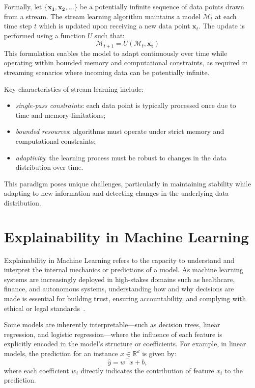Formally, let $\{\mathbf{x_1, x_2,\ldots} \} $ be a potentially infinite
sequence of data points drawn from a stream. The stream learning algorithm
maintains a model $\mathcal{M}_t$ at each time step $t$ which is updated upon
receiving a new data point $\mathbf{x}_t$. The update is performed using a
function $U$ such that:
\begin{equation}
    \mathcal{M}_{t+1} = U(\mathcal{M}_t, \mathbf{x_t})
\end{equation}
This formulation enables the model to adapt continuously over time while
operating within bounded memory and computational constraints, as required
in streaming scenarios where incoming data can be potentially infinite.

Key characteristics of stream learning include:
\begin{itemize}
    \item \emph{single-pass constraints}: each data point is typically processed once due to
          time and memory limitations;
    \item \emph{bounded resources}: algorithms must operate under strict memory and
          computational constraints;
    \item \emph{adaptivity}: the learning process must be robust to changes in the data
          distribution over time.
\end{itemize}

This paradigm poses unique challenges, particularly in maintaining stability
while adapting to new information and detecting changes in the underlying data
distribution.

\section{Explainability in Machine Learning}\label{sec:explainability}

Explainability in Machine Learning refers to the capacity to understand and
interpret the internal mechanics or predictions of a model. As machine learning
systems are increasingly deployed in high-stakes domains such as healthcare,
finance, and autonomous systems, understanding how and why decisions are made
is essential for building trust, ensuring accountability, and complying with
ethical or legal standards~\cite{importance_of_explainabilty}.

Some models are inherently interpretable---such as decision trees, linear
regression, and logistic regression---where the influence of each feature is
explicitly encoded in the model's structure or coefficients. For example, in
linear models, the prediction for an instance $x \in \mathbb{R}^d$ is given by:
\begin{equation}
    \hat{y} = w^\top x + b,
\end{equation}
where each coefficient $w_i$ directly indicates the contribution of feature
$x_i$ to the prediction.

